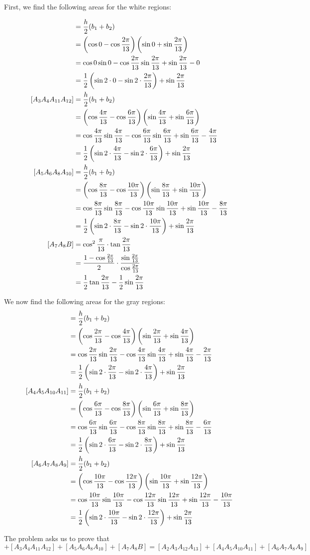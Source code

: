 \documentclass[10pt]{../usamts}
\begin{document}
\begin{solution}{5}
First, we find the following areas for the white regions:

\newcommand{\showareacalc}[2]{
    &= \frac{h}{2}(b_1 + b_2) \\
    &= \paren{\cos{#1} - \cos{#2}}\paren{\sin{#1} + \sin{#2}} \\
    &= \cos{#1}\sin{#1} - \cos{#2} \sin{#2} + \sin{#2 - #1} \\
    &= \frac{1}{2}\paren{\sin{2 \cdot #1} - \sin{2 \cdot #2}} + \sin{\frac{2\pi}{13}}
}
\newcommand{\showtrianglebarea}{
    \frac{1}{2} \tan{\frac{2\pi}{13}} - \frac{1}{2} \sin{\frac{2\pi}{13}}
}

\newcommand{\sinthirteen}[1]{
    \sin{{\frac{#1\pi}{13}}}
}
\newcommand{\costhirteen}[1]{
    \cos{{\frac{#1\pi}{13}}}
}
\newcommand{\tanthirteen}[1]{
    \tan{{\frac{#1\pi}{13}}}
}

\newcommand{\expthirteen}[1]{
    e^{\frac{#1\pi}{13}}
}

\begin{align*} 
[A_1A_2A_3] \showareacalc{0}{\frac{2\pi}{13}} \\
[A_3A_4A_{11}A_{12}] \showareacalc{\frac{4\pi}{13}}{\frac{6\pi}{13}} \\
[A_5A_6A_{8}A_{10}] \showareacalc{\frac{8\pi}{13}}{\frac{10\pi}{13}} \\
    [A_7A_8B] &= \cos^2{\frac{\pi}{13}} \cdot \tan{\frac{2\pi}{13}} \\
              &= \frac{1 - \cos{\frac{2\pi}{13}}}{2} \cdot \frac{\sin{\frac{2\pi}{13}}}{\cos{\frac{2\pi}{13}}}\\
              &= \showtrianglebarea
\end{align*}

We now find the following areas for the gray regions:
\begin{align*}
[A_2A_3A_{12}A_{13}] \showareacalc{\frac{2\pi}{13}}{\frac{4\pi}{13}} \\
[A_4A_5A_{10}A_{11}] \showareacalc{\frac{6\pi}{13}}{\frac{8\pi}{13}} \\
[A_6A_7A_{8}A_{9}] \showareacalc{\frac{10\pi}{13}}{\frac{12\pi}{13}} \\
\end{align*}

The problem asks us to prove that
\begin{equation}
[A_1A_2A_3] + [A_3A_4A_{11}A_{12}] + [A_5A_6A_{8}A_{10}] + [A_7A_8B] = [A_2A_3A_{12}A_{13}] + [A_4A_5A_{10}A_{11}]+ [A_6A_7A_{8}A_{9}]
\end{equation}


\end{solution}
\end{document}

